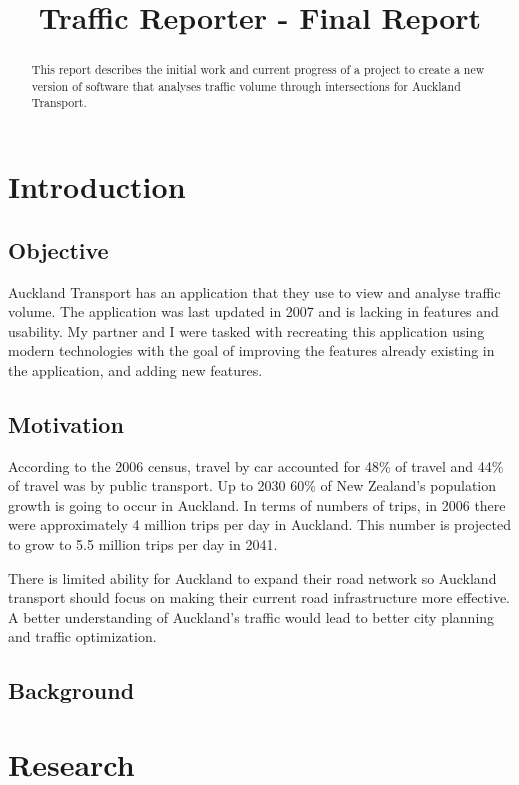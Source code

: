 \documentclass{article}
\title{Traffic Reporter - Final Report}
\begin{document}


\maketitle

\begin{abstract}
This report describes the initial work and current
progress of a project to create a new version of software that
analyses traffic volume through intersections for Auckland
Transport\cite{sims1981scat}.

\end{abstract}

\section{Introduction}
\subsection{Objective}
Auckland Transport has an application that they use to view and analyse traffic volume. The application was last updated in 2007 and is lacking in features and usability. My partner and I were tasked with recreating this application using modern technologies with the goal of improving the features already existing in the application, and adding new features.

\subsection{Motivation}
According to the 2006 census, travel by car accounted for 48\% of travel and 44\% of travel was by public transport. Up to 2030 60\% of New Zealand's population growth is going to occur in Auckland. In terms of numbers of trips, in 2006 there were approximately 4 million trips per day in Auckland. This number is projected to grow to 5.5 million trips per day in 2041. 

There is limited ability for Auckland to expand their road network so Auckland transport should focus on making their current road infrastructure more effective. A better understanding of Auckland's traffic would lead to better city planning and traffic optimization.

\subsection{Background}

\section{Research}
\end{document}
